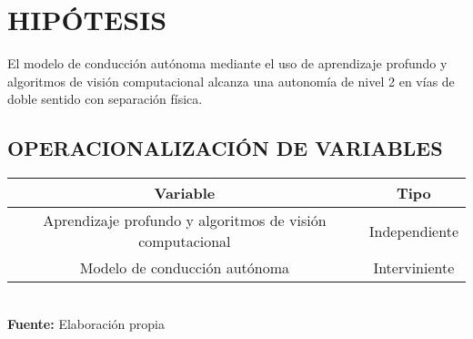 \section{HIPÓTESIS}
El modelo de conducción autónoma mediante el uso de aprendizaje profundo y algoritmos de visión computacional alcanza una autonomía de nivel 2 en vías de doble sentido con separación física.

\subsection{OPERACIONALIZACIÓN DE VARIABLES}

\begin{center}
    \begin{tabular}{|c|c|}
        \hline
        \textbf{Variable} & \textbf{Tipo} \\
        \hline
        Aprendizaje profundo y algoritmos de visión computacional & Independiente \\
        \hline
        Modelo de conducción autónoma & Interviniente\\
        \hline
    \end{tabular}\\
    \vspace{2mm}
    \textbf{Fuente:} Elaboración propia
\end{center}